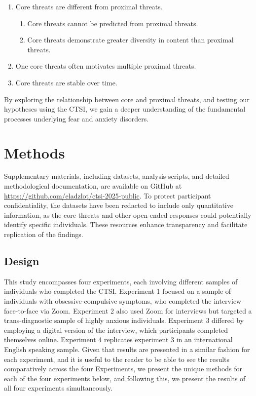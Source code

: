 \documentclass[
  man,floatsintext]{apa7}
\providecommand{\tightlist}{%
  \setlength{\itemsep}{0pt}\setlength{\parskip}{0pt}}
\begin{document}
\begin{enumerate}
\def\labelenumi{\arabic{enumi}.}
\tightlist
\item
  Core threats are different from proximal threats.

  \begin{enumerate}
  \def\labelenumii{\alph{enumii}.}
  \tightlist
  \item
    Core threats cannot be predicted from proximal threats.
  \item
    Core threats demonstrate greater diversity in content than proximal threats.
  \end{enumerate}
\item
  One core threats often motivates multiple proximal threats.
\item
  Core threats are stable over time.
\end{enumerate}

By exploring the relationship between core and proximal threats, and testing our hypotheses using the CTSI, we gain a deeper understanding of the fundamental processes underlying fear and anxiety disorders.

\section{Methods}\label{methods}

Supplementary materials, including datasets, analysis scripts, and detailed methodological documentation, are available on GitHub at \url{https://github.com/eladzlot/ctsi-2025-public}.
To protect participant confidentiality, the datasets have been redacted to include only quantitative information, as the core threats and other open-ended responses could potentially identify specific individuals.
These resources enhance transparency and facilitate replication of the findings.

\subsection{Design}\label{design}

This study encompasses four experiments, each involving different samples of individuals who completed the CTSI.
Experiment 1 focused on a sample of individuals with obsessive-compulsive symptoms, who completed the interview face-to-face via Zoom.
Experiment 2 also used Zoom for interviews but targeted a trans-diagnostic sample of highly anxious individuals.
Experiment 3 differed by employing a digital version of the interview, which participants completed themselves online.
Experiment 4 replicates experiment 3 in an international English speaking sample.
Given that results are presented in a similar fashion for each experiment, and it is useful to the reader to be able to see the results comparatively across the four Experiments, we present the unique methods for each of the four experiments below, and following this, we present the results of all four experiments simultaneously.
\end{document}
